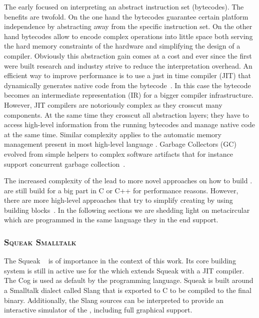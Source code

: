 The early \VMs focused on interpreting an abstract instruction set (bytecodes).
The benefits are twofold.
On the one hand the bytecodes guarantee certain platform independence by abstracting away from the \CPU specific instruction set.
On the other hand bytecodes allow to encode complex operations into little space both serving the hard memory constraints of the hardware and simplifying the design of a compiler.
Obviously this abstraction gain comes at a cost and ever since the first \VMs were built research and industry strive to reduce the interpretation overhead.
An efficient way to improve performance is to use a just in time compiler (JIT) that dynamically generates native code from the bytecode~\cite{Deut84a}.
In this case the bytecode becomes an intermediate representation (IR) for a bigger compiler infrastructure.
However, JIT compilers are notoriously complex as they crosscut many \VM components.
At the same time they crosscut all abstraction layers; they have to access high-level information from the running bytecodes and manage native code at the same time.
Similar complexity applies to the automatic memory management present in most high-level language \VMs.
Garbage Collectors (GC) evolved from simple helpers to complex software artifacts that for instance support concurrent garbage collection~\cite{Clic05a}.

The increased complexity of the \VMs lead to more novel approaches on how to build \VMs.
\VMs are still build for a big part in C or C++ for performance reasons.
However, there are more high-level approaches that try to simplify creating \VMs by using building blocks~\cite{Geof10a}.
In the following sections we are shedding light on metacircular \VMs which are programmed in the same language they in the end support.


\subsubsection*{\textsc{Squeak Smalltalk \VM}}
The Squeak \VM~\cite{Inga97a} is of importance in the context of this work.
Its core building system is still in active use for the  which extends Squeak with a JIT compiler.
The Cog \VM is used as default by the  programming language.
Squeak is built around a Smalltalk dialect called Slang that is exported to C to be compiled to the final \VM binary.
Additionally, the Slang sources can be interpreted to provide an interactive simulator of the \VM, including full graphical support.

